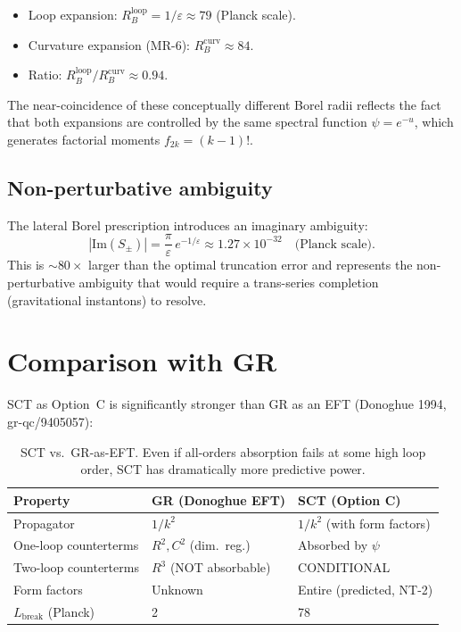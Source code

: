\documentclass[12pt,a4paper]{article}
\begin{document}
\begin{itemize}
  \item Loop expansion: $R_B^{\mathrm{loop}} = 1/\varepsilon \approx 79$ (Planck scale).
  \item Curvature expansion (MR-6): $R_B^{\mathrm{curv}} \approx 84$.
  \item Ratio: $R_B^{\mathrm{loop}} / R_B^{\mathrm{curv}} \approx 0.94$.
\end{itemize}
The near-coincidence of these conceptually different Borel radii reflects
the fact that both expansions are controlled by the same spectral function
$\psi = e^{-u}$, which generates factorial moments $f_{2k} = (k-1)!$.

\subsection{Non-perturbative ambiguity}

The lateral Borel prescription introduces an imaginary ambiguity:
\begin{equation}
  |\mathrm{Im}(S_\pm)| = \frac{\pi}{\varepsilon}\,e^{-1/\varepsilon}
  \approx 1.27 \times 10^{-32}
  \quad\text{(Planck scale)}.
\end{equation}
This is $\sim 80\times$ larger than the optimal truncation error and represents
the non-perturbative ambiguity that would require a trans-series completion
(gravitational instantons) to resolve.

\section{Comparison with GR}
\label{sec:gr-comparison}

SCT as Option~C is significantly stronger than GR as an EFT
(Donoghue 1994, gr-qc/9405057):

\begin{table}[H]
\centering
\begin{tabular}{lll}
\toprule
Property & GR (Donoghue EFT) & SCT (Option C) \\
\midrule
Propagator & $1/k^2$ & $1/k^2$ (with form factors) \\
One-loop counterterms & $R^2, C^2$ (dim.\ reg.) & Absorbed by $\psi$ \\
Two-loop counterterms & $R^3$ (NOT absorbable) & CONDITIONAL \\
Form factors & Unknown & Entire (predicted, NT-2) \\
$L_{\mathrm{break}}$ (Planck) & 2 & 78 \\
\bottomrule
\end{tabular}
\caption{SCT vs.\ GR-as-EFT. Even if all-orders absorption fails at
some high loop order, SCT has dramatically more predictive power.}
\label{tab:gr-comparison}
\end{table}
\end{document}

